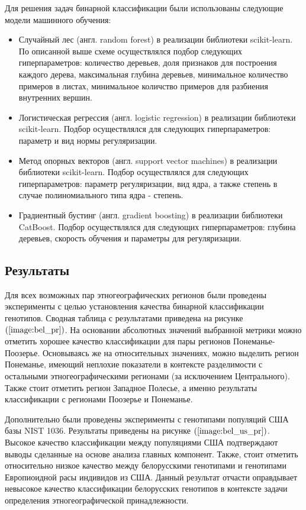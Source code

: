 Для решения задач бинарной классификации были использованы следующие модели машинного обучения:
\begin{itemize}
\item Случайный лес (англ. random forest) в реализации библиотеки scikit-learn.
По описанной выше схеме осуществлялся подбор следующих гиперпараметров: количество деревьев, доля признаков
для построения каждого дерева, максимальная глубина деревьев, минимальное количество примеров в листах,
минимальное количство примеров для разбиения внутренних вершин.

\item Логистическая регрессия (англ. logistic regression) в реализации библиотеки scikit-learn.
Подбор осуществлялся для следующих гиперпараметров: параметр и вид нормы регуляризации.

\item Метод опорных векторов (англ. support vector machines) в реализации библиотеки scikit-learn.
Подбор осуществлялся для следующих гиперпараметров: параметр регуляризации, вид ядра, а также степень
в случае полиномиального типа ядра - степень.


\item Градиентный бустинг (англ. gradient boosting) в реализации библиотеки CatBoost.
Подбор осуществлялся для следующих гиперпараметров: глубина деревьев, скорость обучения и
параметры для регуляризации.
\end{itemize}

\subsection{Результаты}

Для всех возможных пар этногеографических регионов были проведены эксперименты с целью установления
качества бинарной классификации генотипов. Сводная таблица с результатами приведена на рисунке
$\left(\ref{image:bel_pr}\right)$. На основании абсолютных значений выбранной метрики можно отметить
хорошее качество классификации для пары регионов Понеманье-Поозерье. Основываясь же на относительных значениях,
можно выделить регион Понеманье, имеющий неплохие показатели в контексте разделимости с
остальными этногеографическими регионами (за исключением Центрального). Также стоит отметить регион
Западное Полесье, а именно результаты классификации с регионами Поозерье и Понеманье.

Дополнительно были проведены эксперименты с генотипами популяций США базы NIST 1036.
Результаты приведены на рисунке $\left(\ref{image:bel_us_pr}\right)$. Высокое качество
классификации между популяциями США подтверждают выводы сделанные на основе анализа
главных компонент. Также, стоит отметить относительно низкое качество между
белорусскими генотипами и генотипами Европиоидной расы индивидов из США.
Данный результат отчасти оправдывает невысокое качество классификации белорусских генотипов
в контексте задачи определения этногеографической принадлежности.

